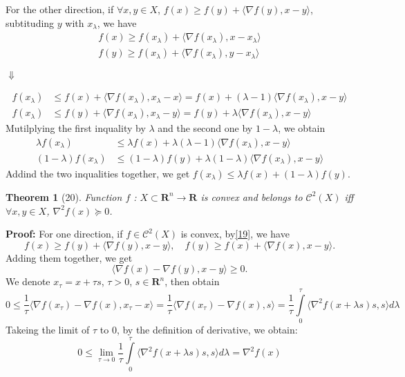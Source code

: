 \documentclass[12pt]{article}
\theoremstyle{mystyle}
\newtheorem{theorem}{Theorem}
\begin{document}
For the other direction, if $\forall x,y \in X$, $f(x) \geq f(y) + \langle \nabla f(y), x - y \rangle$, subtituding $y$ with $x_\lambda$, we have
\begin{equation*}
\begin{split}
    f(x) \geq f(x_\lambda) + \langle \nabla f(x_\lambda), x - x_\lambda \rangle\\
    f(y) \geq f(x_\lambda) + \langle \nabla f(x_\lambda), y - x_\lambda \rangle
\end{split}
\end{equation*}
\begin{center}
$\Downarrow$ 
\end{center}
\begin{equation*}
\begin{split}
        f(x_\lambda) &\leq f(x) + \langle \nabla f(x_\lambda), x_\lambda - x\rangle = f(x) + (\lambda-1)\langle \nabla f(x_\lambda), x-y\rangle\\
        f(x_\lambda) &\leq f(y) + \langle \nabla f(x_\lambda),x_\lambda - y\rangle= f(y) + \lambda\langle \nabla f(x_\lambda), x-y\rangle
\end{split}
\end{equation*}
Mutilplying the first inquality by $\lambda$ and the second one by $1-\lambda$, we obtain
\begin{equation*}
\begin{split}
        \lambda f(x_\lambda ) &\leq \lambda f(x) + \lambda(\lambda-1) \langle \nabla f(x_\lambda), x-y\rangle\\
        (1-\lambda)f(x_\lambda) &\leq (1-\lambda)f(y) + \lambda(1-\lambda)\langle \nabla f(x_\lambda), x-y\rangle
\end{split}
\end{equation*}
Addind the two inqualities together, we get $f(x_\lambda) \leq \lambda f(x) + (1-\lambda) f(y)$.

\begin{theorem}[20]
    \label{20}
    Function $f$ : $X \subset \mathbf{R}^n \rightarrow \mathbf{R}$ is convex and belongs to $\mathcal{C}^2(X)$ iff 
    $\forall x,y \in X$, $\nabla^2 f(x) \succeq 0$.
\end{theorem}
\textbf{Proof:} For one direction, if $f \in \mathcal{C}^2(X)$ is convex, by\ref{19}, we have
$$f(x) \geq f(y) + \langle \nabla f(y), x - y \rangle,\quad f(y) \geq f(x) + \langle \nabla f(x), x - y \rangle.$$
Adding them together, we get
\begin{equation}
    \langle \nabla f(x) - \nabla f(y), x-y\rangle \geq 0. 
\end{equation}
We denote $x_\tau = x+ \tau s$, $\tau >0$, $s \in \mathbf{R}^n$, then obtain
$$0 \leq \frac{1}{\tau}\langle \nabla f(x_\tau) - \nabla f(x), x_\tau-x\rangle = \frac{1}{\tau}\langle \nabla f(x_\tau) - \nabla f(x), s\rangle= \frac{1}{\tau}\int\limits_0^\tau \langle \nabla^2 f(x+\lambda s)s, s\rangle d\lambda$$
Takeing the limit of $\tau$ to 0, by the definition of derivative, we obtain:
$$0 \leq\lim\limits_{\tau \rightarrow 0} \frac{1}{\tau}\int\limits_0^\tau \langle \nabla^2 f(x+\lambda s)s, s\rangle d\lambda = \nabla^2 f(x)$$
\end{document}
